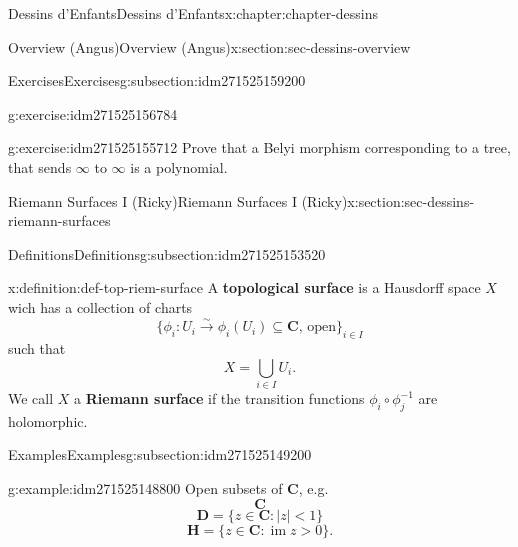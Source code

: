 \documentclass[oneside,10pt,]{book}
\newcommand{\terminology}[1]{\textbf{#1}}
\numberwithin{equation}{section}
\newcommand{\CC}{\mathbf{C}}
\newcommand{\HH}{\mathbf{H}}
\DeclareMathOperator{\im}{im}
\newcommand{\lt}{<}
\newcommand{\gt}{>}
\begin{document}
\begin{chapterptx}{Dessins d'Enfants}{}{Dessins d'Enfants}{}{}{x:chapter:chapter-dessins}
\begin{sectionptx}{Overview (Angus)}{}{Overview (Angus)}{}{}{x:section:sec-dessins-overview}
\begin{subsectionptx}{Exercises}{}{Exercises}{}{}{g:subsection:idm271525159200}
\begin{inlineexercise}{}{g:exercise:idm271525156784}
\end{inlineexercise}
\begin{inlineexercise}{}{g:exercise:idm271525155712}%
Prove that a Belyi morphism corresponding to a tree, that sends \(\infty\) to \(\infty\) is a polynomial.%
\end{inlineexercise}
\end{subsectionptx}
\end{sectionptx}
%
%
\typeout{************************************************}
\typeout{************************************************}
%
\begin{sectionptx}{Riemann Surfaces I (Ricky)}{}{Riemann Surfaces I (Ricky)}{}{}{x:section:sec-dessins-riemann-surfaces}
%
%
\typeout{************************************************}
\typeout{************************************************}
%
\begin{subsectionptx}{Definitions}{}{Definitions}{}{}{g:subsection:idm271525153520}
\begin{definition}{}{x:definition:def-top-riem-surface}%
A \terminology{topological surface} is a Hausdorff space \(X\) wich has a collection of charts%
\begin{equation*}
\{\phi_i \colon U_i \xrightarrow\sim \phi_i(U_i) \subseteq \CC,\,\text{open}\}_{i\in I}
\end{equation*}
such that%
\begin{equation*}
X= \bigcup_{i\in I} U_i\text{.}
\end{equation*}
We call \(X\) a \terminology{Riemann surface} if the transition functions \(\phi_i\circ \phi_j^{-1}\) are holomorphic.%
\end{definition}
\end{subsectionptx}
%
%
\typeout{************************************************}
\typeout{************************************************}
%
\begin{subsectionptx}{Examples}{}{Examples}{}{}{g:subsection:idm271525149200}
\begin{example}{}{g:example:idm271525148800}%
Open subsets of \(\CC\), e.g.%
\begin{equation*}
\CC
\end{equation*}
%
\begin{equation*}
\mathbf D = \{z\in \CC : |z| \lt 1 \}
\end{equation*}
%
\begin{equation*}
\HH = \{z\in \CC : \im z \gt 0 \}\text{.}

\end{equation*}
\end{example}
\end{subsectionptx}
\end{sectionptx}
\end{chapterptx}
\end{document}
